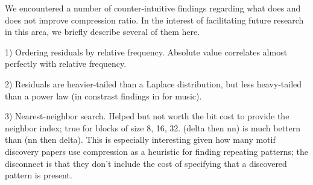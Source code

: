 We encountered a number of counter-intuitive findings regarding what does and does not improve compression ratio. In the interest of facilitating future research in this area, we briefly describe several of them here.

1) Ordering residuals by relative frequency. Absolute value correlates almost perfectly with relative frequency. %

2) Residuals are heavier-tailed than a Laplace distribution, but less heavy-tailed than a power law (in constrast findings in \cite{shorten} for music).

3) Nearest-neighbor search. Helped but not worth the bit cost to provide the neighbor index; true for blocks of size 8, 16, 32. (delta then nn) is much bettern than (nn then delta). This is especially interesting given how many motif discovery papers use compression as a heuristic for finding repeating patterns; the disconnect is that they don't include the cost of specifying that a discovered pattern is present.

